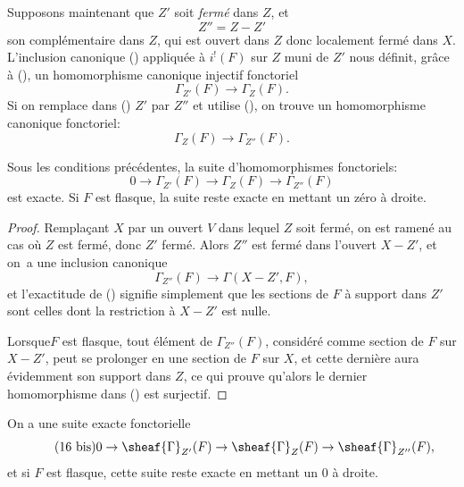 Supposons maintenant que $Z'$ soit \textit{ferm\'e} dans $Z$, et
$$Z''=Z-Z'$$
son compl\'ementaire dans $Z$, qui est ouvert dans $Z$ donc localement ferm\'e dans $X$. L'inclusion canonique () appliqu\'ee \`a $i^!(F)$ sur $Z$ muni de $Z'$ nous d\'efinit, gr\^ace \`a (), un homomorphisme canonique injectif fonctoriel
\begin{equation} \label{eq:I.15} {\Gamma_{Z'}(F) \to \Gamma_Z(F)}.
\end{equation}
Si on remplace dans () $Z'$ par $Z''$ et utilise (), on trouve un homomorphisme canonique fonctoriel:
\begin{equation*} \label{eq:I.15'} \tag{$15'$} {\Gamma_Z(F) \to \Gamma_{Z''}(F)}.
\end{equation*}

\begin{proposition} \label{I.1.8} Sous les conditions pr\'ec\'edentes, la suite d'homomorphismes fonctoriels:
\begin{equation} \label{eq:I.16} {0 \to \Gamma_{Z'}(F) \to \Gamma_Z(F) \to \Gamma_{Z''}(F)}
\end{equation}
est exacte. Si $F$ est flasque, la suite reste exacte en mettant un z\'ero \`a droite.
\end{proposition}

\begin{proof}
Rempla\c cant $X$ par un ouvert $V$ dans lequel $Z$ soit ferm\'e, on
est ramen\'e au cas o\`u $Z$ est ferm\'e, donc $Z'$ ferm\'e. Alors $Z''$
est ferm\'e dans l'ouvert $X-Z'$, et on~a une inclusion canonique
$$
\Gamma_{Z''}(F) \to \Gamma(X-Z', F),
$$
et l'exactitude de () signifie simplement que les sections de $F$ \`a support dans $Z'$ sont celles dont la restriction \`a $X-Z'$ est nulle.

Lorsque\pageoriginale $F$ est flasque, tout \'el\'ement de $\Gamma_{Z''}(F)$, consid\'er\'e comme section de $F$ sur $X-Z'$, peut se prolonger en une section de $F$ sur $X$, et cette derni\`ere aura \'evidemment son support dans $Z$, ce qui prouve qu'alors le dernier homomorphisme dans () est surjectif.
\skipqed
\end{proof}

\begin{corollaire} \label{I.1.9} On a une suite exacte fonctorielle
\begin{equation*} \label{eq:I.16bis} \tag{16 bis} {0 \to \sheaf{\Gamma}_{Z'}(F) \to \sheaf{\Gamma}_Z(F) \to \sheaf{\Gamma}_{Z''}(F)},
\end{equation*}
et si $F$ est flasque, cette suite reste exacte en mettant un $0$ \`a droite.
\end{corollaire}

